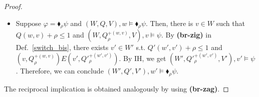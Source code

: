 \begin{proof}
 \begin{itemize}
        \item Suppose $\varphi=\blacklozenge_\rho\psi$ and $(W,{Q},V),w\models\blacklozenge_\rho\psi$. Then, there is $v\in W$ such that
            ${Q}(w,v)+\rho\leq 1$ and $(W,{Q}^{+(w,v)}_\rho,V),v\models\psi$. 
        By \textbf{(br-zig)} in Def.~\ref{switch_bis}, there exists $v'\in W'$ s.t. 
        ${Q}'(w',v') + \rho \leq 1$ and $(v,{Q}^{+(w,v)}_\rho)E(v',{Q}'^{+(w',v')}_\rho)$. 
        By IH, we get $(W',{Q}'^{+(w',v')}_\rho,V'),v'\models\psi$. 
        Therefore, we can conclude $(W',{Q}',V'),w'\models\blacklozenge_\rho\psi$. 
    \end{itemize}
    The reciprocal implication is obtained analogously by using \textbf{(br-zag)}.



\end{proof}
